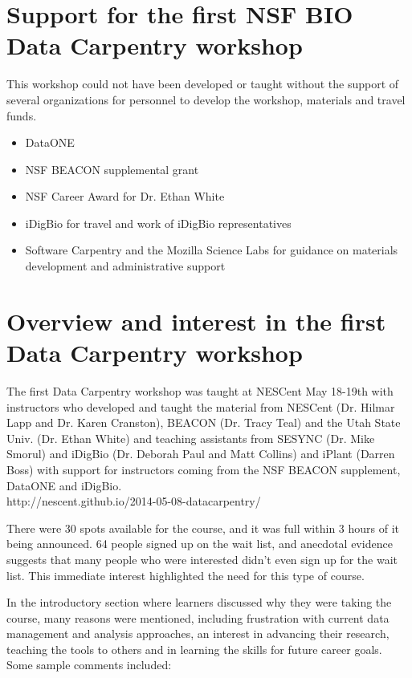 \documentclass[11pt]{article}
\begin{document}
\section{Support for the first NSF BIO Data Carpentry workshop}
This workshop could not have been developed or taught without the support of several organizations for personnel to develop the workshop, materials and travel funds.
\begin{itemize}
\item{DataONE}
\item{NSF BEACON supplemental grant}
\item{NSF Career Award for Dr. Ethan White}
\item{iDigBio for travel and work of iDigBio representatives}
\item{Software Carpentry and the Mozilla Science Labs for guidance on materials development and administrative support}
\end{itemize}

\section{Overview and interest in the first Data Carpentry workshop}

The first Data Carpentry workshop was taught at NESCent May 18-19th with instructors who developed and taught the material from NESCent (Dr. Hilmar Lapp and Dr. Karen Cranston), BEACON (Dr. Tracy Teal) and the Utah State Univ. (Dr. Ethan White) and teaching assistants from SESYNC (Dr. Mike Smorul) and iDigBio (Dr. Deborah Paul and Matt Collins) and iPlant (Darren Boss) with support for instructors coming from the NSF BEACON supplement, DataONE and iDigBio.
\\http://nescent.github.io/2014-05-08-datacarpentry/

There were 30 spots available for the course, and it was full within 3 hours of it being announced. 64 people signed up on the wait list, and anecdotal evidence suggests that many people who were interested didn't even sign up for the wait list. This immediate interest highlighted the need for this type of course.

In the introductory section where learners discussed why they were taking the course, many reasons were mentioned, including frustration with current data management and analysis approaches, an interest in advancing their research, teaching the tools to others and in learning the skills for future career goals. Some sample comments included:
\end{document}
